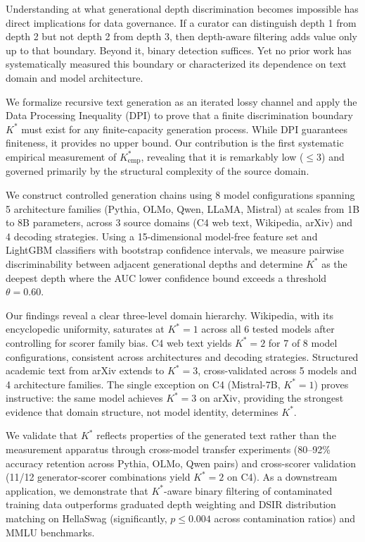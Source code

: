 \documentclass[11pt,a4paper]{article}
\newcommand{\Kstar}{K^{*}}
\newcommand{\Kempirical}{K^{*}_{\text{emp}}}
\begin{document}
Understanding at what generational depth discrimination becomes impossible has direct implications for data governance. If a curator can distinguish depth 1 from depth 2 but not depth 2 from depth 3, then depth-aware filtering adds value only up to that boundary. Beyond it, binary detection suffices. Yet no prior work has systematically measured this boundary or characterized its dependence on text domain and model architecture.

We formalize recursive text generation as an iterated lossy channel and apply the Data Processing Inequality (DPI) to prove that a finite discrimination boundary $\Kstar$ must exist for any finite-capacity generation process. While DPI guarantees finiteness, it provides no upper bound. Our contribution is the first systematic empirical measurement of $\Kempirical$, revealing that it is remarkably low ($\leq 3$) and governed primarily by the structural complexity of the source domain.

We construct controlled generation chains using 8 model configurations spanning 5 architecture families (Pythia, OLMo, Qwen, LLaMA, Mistral) at scales from 1B to 8B parameters, across 3 source domains (C4 web text, Wikipedia, arXiv) and 4 decoding strategies. Using a 15-dimensional model-free feature set and LightGBM classifiers with bootstrap confidence intervals, we measure pairwise discriminability between adjacent generational depths and determine $\Kstar$ as the deepest depth where the AUC lower confidence bound exceeds a threshold $\theta = 0.60$.

Our findings reveal a clear three-level domain hierarchy. Wikipedia, with its encyclopedic uniformity, saturates at $\Kstar = 1$ across all 6 tested models after controlling for scorer family bias. C4 web text yields $\Kstar = 2$ for 7 of 8 model configurations, consistent across architectures and decoding strategies. Structured academic text from arXiv extends to $\Kstar = 3$, cross-validated across 5 models and 4 architecture families. The single exception on C4 (Mistral-7B, $\Kstar = 1$) proves instructive: the same model achieves $\Kstar = 3$ on arXiv, providing the strongest evidence that domain structure, not model identity, determines $\Kstar$.

We validate that $\Kstar$ reflects properties of the generated text rather than the measurement apparatus through cross-model transfer experiments (80--92\% accuracy retention across Pythia, OLMo, Qwen pairs) and cross-scorer validation (11/12 generator-scorer combinations yield $\Kstar = 2$ on C4). As a downstream application, we demonstrate that $\Kstar$-aware binary filtering of contaminated training data outperforms graduated depth weighting and DSIR distribution matching on HellaSwag (significantly, $p \leq 0.004$ across contamination ratios) and MMLU benchmarks.
\end{document}
